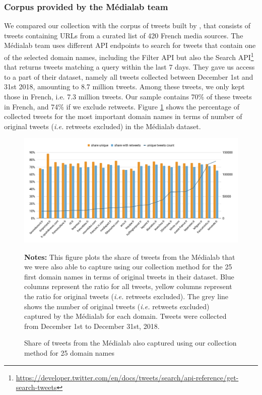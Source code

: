 \subsubsection{Corpus provided by the Médialab team}
We compared our collection with the corpus of tweets built by \citet{cardon2019unfolding}, that consists of
tweets containing URLs from a curated list of 420 French media sources. The Médialab team uses different API endpoints to search for tweets that contain one of the selected domain names, including the Filter API but also the Search API\footnote{\url{https://developer.twitter.com/en/docs/tweets/search/api-reference/get-search-tweets}} that returns tweets matching a query within the last 7 days. They gave us access to a part of their dataset, namely all tweets collected between December 1st and 31st 2018, amounting to 8.7 million tweets. Among these tweets, we only kept those in French, i.e. 7.3 million tweets. Our sample contains 70\% of these tweets in French, and 74\% if we exclude retweets. Figure \ref{Figure:HistogramUrlsMedialab} shows the percentage of collected tweets for the most important domain names in terms of number of original tweets (\textit{i.e.} retweets excluded) in the Médialab dataset.

\begin{figure}
\begin{center}
\includegraphics[width=1\textwidth]{figures/ShareInCommonWithMedialab.pdf}
\end{center}
\scriptsize \textbf{Notes:} This figure plots the share of tweets from the Médialab that we were also able to capture using our collection method for the 25 first domain names in terms of original tweets in their dataset. Blue columns represent the ratio for all tweets, yellow columns represent the ratio for original tweets (\textit{i.e.} retweets excluded). The grey line shows the number of original tweets (\textit{i.e.} retweets excluded) captured by the Médialab for each domain. Tweets were collected from December 1st to December 31st, 2018.

\caption{Share of tweets from the Médialab also captured using our collection method for 25 domain names}
\label{Figure:HistogramUrlsMedialab}
\end{figure}

